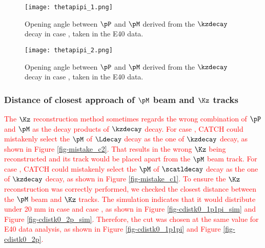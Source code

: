 \begin{figure}[!h]
  \begin{minipage}[t]{0.48\columnwidth}
    \centering
    \texttt{[image: thetapipi\_1.png]}
    \caption{Opening angle between $\pP$ and $\pM$ derived from the $\kzdecay$ decay in case , taken in the E40 data.}
    \label{fig-thetapipi_1}
  \end{minipage}
  \hspace{0.04\columnwidth} %
  \begin{minipage}[t]{0.48\columnwidth}
    \centering
    \texttt{[image: thetapipi\_2.png]}
    \caption{Opening angle between $\pP$ and $\pM$ derived from the $\kzdecay$ decay in case , taken in the E40 data.}
    \label{fig-thetapipi_2}
  \end{minipage}
\end{figure}



\subsubsection{Distance of closest approach of $\pM$ beam and $\Kz$ tracks}
\textcolor{red}{ The $\Kz$ reconstruction method sometimes regards the wrong combination of $\pP$ and $\pM$ as the decay products of $\kzdecay$ decay. For case , CATCH could mistakenly select the $\pM$ of $\Ldecay$ decay as the one of $\kzdecay$ decay, as shown in Figure \ref{fig-mistake_c2}. That results in the wrong $\Kz$ being reconstructed and its track would be placed apart from the $\pM$ beam track. For case , CATCH could mistakenly select the $\pM$ of $\scatldecay$ decay as the one of $\kzdecay$ decay, as shown in Figure \ref{fig-mistake_c1}. 
To ensure the $\Kz$ reconstruction was correctly performed, we checked the closest distance between the $\pM$ beam and $\Kz$ tracks. The simulation indicates that it would distribute under 20 mm in case  and case , as shown in Figure \ref{fig-cdistk0_1p1pi_sim} and Figure \ref{fig-cdistk0_2p_sim}. Therefore, the cut was chosen at the same value for E40 data analysis, as shown in Figure \ref{fig-cdistk0_1p1pi} and Figure \ref{fig-cdistk0_2p}. }


